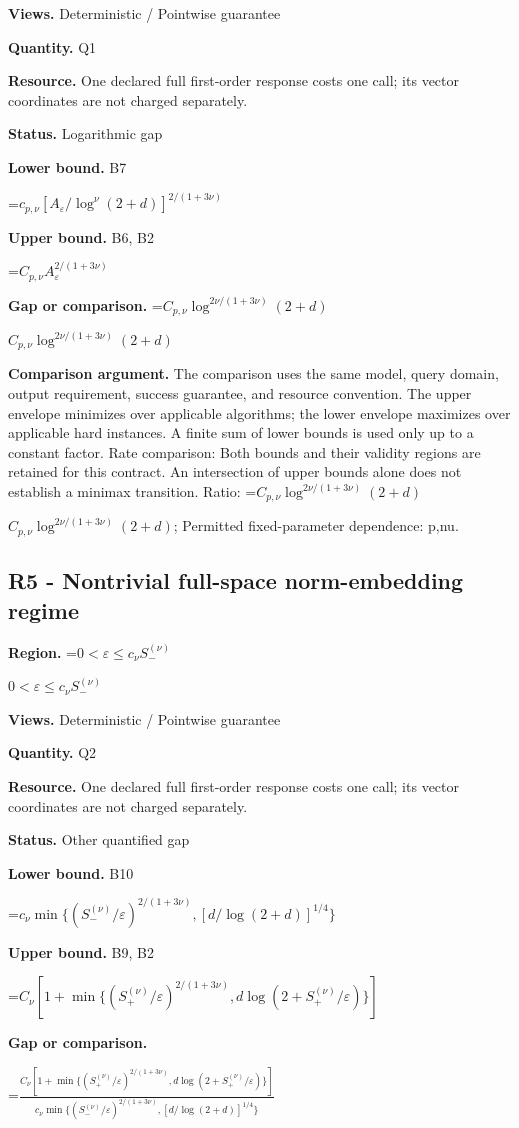 \documentclass[10pt,a4paper]{article}
\newcommand{\AtlasMath}[1]{\par\begingroup\centering\setbox0=\hbox{$\displaystyle #1$}\ifdim\wd0>1.4\linewidth\typeout{ATLAS WIDE FORMULA: \the\wd0}\fi\ifdim\wd0>\linewidth\resizebox{\linewidth}{!}{\box0}\else\box0\fi\par\endgroup}
\newcommand{\AtlasInlineMath}[1]{\begingroup\setbox0=\hbox{$#1$}\ifdim\wd0>.4\linewidth\endgroup\AtlasMath{#1}\else\endgroup$#1$\fi}
\begin{document}
\textbf{Views.} Deterministic / Pointwise guarantee

\textbf{Quantity.} Q1

\textbf{Resource.} One declared full first-order response costs one call; its vector coordinates are not charged separately.

\textbf{Status.} Logarithmic gap

\textbf{Lower bound.} B7

\AtlasMath{c_{p,\nu}[A_\varepsilon/\log^\nu(2+d)]^{2/(1+3\nu)}}
\textbf{Upper bound.} B6, B2

\AtlasMath{C_{p,\nu}A_\varepsilon^{2/(1+3\nu)}}
\textbf{Gap or comparison.} \AtlasInlineMath{C_{p,\nu}\log^{2\nu/(1+3\nu)}(2+d)}

\textbf{Comparison argument.} The comparison uses the same model, query domain, output requirement, success guarantee, and resource convention. The upper envelope minimizes over applicable algorithms; the lower envelope maximizes over applicable hard instances. A finite sum of lower bounds is used only up to a constant factor. Rate comparison: Both bounds and their validity regions are retained for this contract. An intersection of upper bounds alone does not establish a minimax transition. Ratio: \AtlasInlineMath{C_{p,\nu}\log^{2\nu/(1+3\nu)}(2+d)}; Permitted fixed-parameter dependence: p,nu.

\subsection{R5 - Nontrivial full-space norm-embedding regime}
\textbf{Region.} \AtlasInlineMath{0<\varepsilon\le c_\nu S_-^{(\nu)}}

\textbf{Views.} Deterministic / Pointwise guarantee

\textbf{Quantity.} Q2

\textbf{Resource.} One declared full first-order response costs one call; its vector coordinates are not charged separately.

\textbf{Status.} Other quantified gap

\textbf{Lower bound.} B10

\AtlasMath{c_\nu\min\{(S_-^{(\nu)}/\varepsilon)^{2/(1+3\nu)},[d/\log(2+d)]^{1/4}\}}
\textbf{Upper bound.} B9, B2

\AtlasMath{C_\nu[1+\min\{(S_+^{(\nu)}/\varepsilon)^{2/(1+3\nu)},d\log(2+S_+^{(\nu)}/\varepsilon)\}]}
\textbf{Gap or comparison.} 
\AtlasMath{\frac{C_\nu[1+\min\{(S_+^{(\nu)}/\varepsilon)^{2/(1+3\nu)},d\log(2+S_+^{(\nu)}/\varepsilon)\}]}{c_\nu\min\{(S_-^{(\nu)}/\varepsilon)^{2/(1+3\nu)},[d/\log(2+d)]^{1/4}\}}}
\end{document}
